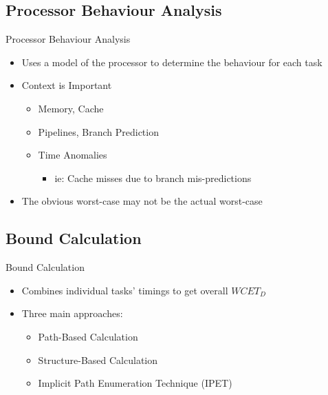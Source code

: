 \documentclass{beamer}
\begin{document}
\subsection{Processor Behaviour Analysis}
\begin{frame}{Processor Behaviour Analysis}
  \begin{itemize}
    \item Uses a model of the processor to determine the behaviour for each task
    \item Context is Important
      \begin{itemize}
        \item Memory, Cache
        \item Pipelines, Branch Prediction
        \item<3-> Time Anomalies
          \begin{itemize}
            \item<3-> ie: Cache misses due to branch mis-predictions
          \end{itemize}
      \end{itemize}
      \item<2-> The obvious worst-case may not be the actual worst-case
  \end{itemize}
\end{frame}

\subsection{Bound Calculation}
\begin{frame}{Bound Calculation}  
  \begin{itemize}
    \item Combines individual tasks' timings to get overall $WCET_D$
      \pause
    \item Three main approaches:
      \begin{itemize}
        \item Path-Based Calculation
        \item Structure-Based Calculation
        \item Implicit Path Enumeration Technique (IPET)
      \end{itemize}
  \end{itemize}
\end{frame}
\end{document}
